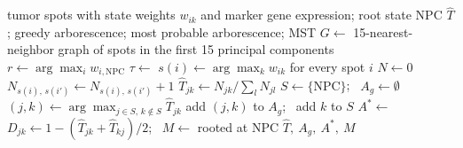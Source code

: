 \documentclass[11pt]{article}
\begin{document}
\begin{algorithm}[h]
\caption{\textbf{Directed transitions and trees from pseudotime.} Builds the transition matrix $\hat{T}$ from diffusion pseudotime and derives three trees rooted at NPC.}
\begin{algorithmic}
\Require tumor spots with state weights $w_{ik}$ and marker gene expression; root state NPC
\Ensure $\hat{T}$; greedy arborescence; most probable arborescence; MST
\State $G \gets$ 15-nearest-neighbor graph of spots in the first 15 principal components
\State $r \gets \arg\max_i w_{i,\mathrm{NPC}}$ 
\State $\tau \gets$ 
\State $s(i) \gets \arg\max_k w_{ik}$ for every spot $i$ 
\State $N \gets 0$
  \State $N_{s(i),\,s(i')} \gets N_{s(i),\,s(i')} + 1$
\EndFor
\State $\hat{T}_{jk} \gets N_{jk} / \sum_l N_{jl}$ 
\State $S \gets \{\mathrm{NPC}\}$; \ $A_g \gets \emptyset$
  \State $(j, k) \gets \arg\max_{j \in S,\, k \notin S} \hat{T}_{jk}$
  \State add $(j, k)$ to $A_g$; \ add $k$ to $S$ 
\EndWhile
\State $A^{*} \gets$  
\State $D_{jk} \gets 1 - (\hat{T}_{jk} + \hat{T}_{kj})/2$; \ $M \gets$  rooted at NPC 
\State \Return $\hat{T},\ A_g,\ A^{*},\ M$
\end{algorithmic}
\end{algorithm}
\end{document}

